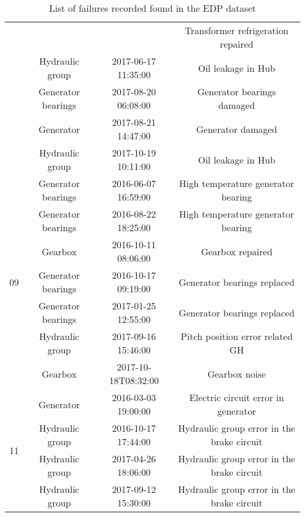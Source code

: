 \begin{table}[H]
\begin{tabular}{|c|c|c|c|}
    & & & Transformer refrigeration repaired \\
    & Hydraulic group & 2017-06-17 11:35:00 & Oil leakage in Hub \\
    & Generator bearings & 2017-08-20 06:08:00 & Generator bearings damaged \\
    & Generator & 2017-08-21 14:47:00 & Generator damaged \\
    & Hydraulic group & 2017-10-19 10:11:00 & Oil leakage in Hub \\
    \hline
    \multirow{7}{*}{09} & Generator bearings & 2016-06-07 16:59:00 & High temperature generator bearing \\
    & Generator bearings & 2016-08-22 18:25:00 & High temperature generator bearing \\
    & Gearbox & 2016-10-11 08:06:00 & Gearbox repaired \\
    & Generator bearings & 2016-10-17 09:19:00 & Generator bearings replaced \\
    & Generator bearings & 2017-01-25 12:55:00 & Generator bearings replaced \\
    & Hydraulic group & 2017-09-16 15:46:00 & Pitch position error related GH \\
    & Gearbox & 2017-10-18T08:32:00 & Gearbox noise \\
    \hline
    \multirow{4}{*}{11} & Generator & 2016-03-03 19:00:00 & Electric circuit error in generator \\
    & Hydraulic group & 2016-10-17 17:44:00 & Hydraulic group error in the brake circuit \\
    & Hydraulic group & 2017-04-26 18:06:00 & Hydraulic group error in the brake circuit \\
    & Hydraulic group & 2017-09-12 15:30:00 & Hydraulic group error in the brake circuit \\
    \hline
    \end{tabular}
    \caption{List of failures recorded found in the EDP dataset}
    \label{tab:failures}
\end{table}
